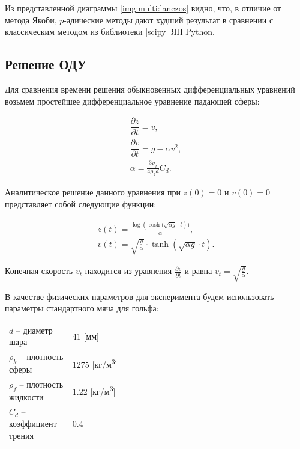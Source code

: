 \documentclass[master, och, diploma, times]{sty/SCWorks}
\theoremstyle{plain}
\theoremstyle{definition}
\numberwithin{equation}{section}
\begin{document}
Из представленной диаграммы \ref{img:multi:lanczos} видно, что, в отличие от метода \mbox{Якоби}, $p$-адические методы дают худший результат в сравнении с классическим методом из библиотеки |scipy| ЯП Python.


\subsection{Решение ОДУ}
Для сравнения времени решения обыкновенных дифференциальных уравнений возьмем простейшее дифференциальное уравнение падающей \mbox{сферы:}

\begin{equation}
\begin{aligned}
\dfrac{\partial z}{ \partial t} = v, \\
\dfrac{\partial v}{ \partial t} = g - \alpha v^2, \\
\alpha = \frac{3\rho_f}{4\rho_k d}C_d.
\end{aligned}
\end{equation}

\noindent Аналитическое решение данного уравнения при $z(0)=0$ и $v(0)=0$ представляет собой следующие функции:

\begin{equation}
\begin{aligned}
z(t)=\frac{\log{(\cosh{(\sqrt{\alpha g} \cdot t})})}{\alpha}, \\
v(t)=\sqrt{\frac{g}{\alpha}} \cdot \tanh{(\sqrt{\alpha g} \cdot t)}.
\end{aligned}
\end{equation}

\noindent Конечная скорость $v_t$ находится из уравнения $\frac{\partial v}{ \partial t}$ и равна $v_t=\sqrt{\frac{g}{\alpha}}$.

В качестве физических параметров для эксперимента будем использовать параметры стандартного мяча для гольфа:

\begin{threeparttable}
\begin{longtable}[H]{lp{0.7\linewidth}}
{$d$} -- диаметр шара & 41 [мм] \\
{$\rho_k$} -- плотность сферы & 1275 [кг/м\textsuperscript{3}] \\
{$\rho_f$} -- плотность жидкости & 1.22 [кг/м\textsuperscript{3}] \\
{$C_d$} -- коэффициент трения & 0.4
\end{longtable}
\end{threeparttable}
\end{document}
